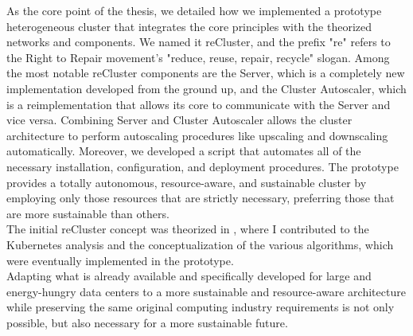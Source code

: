 As the core point of the thesis, we detailed how we implemented a prototype
heterogeneous cluster that integrates the core principles with the theorized
networks and components. We named it reCluster, and the prefix "re" refers to
the Right to Repair movement's "reduce, reuse, repair, recycle" slogan. Among
the most notable reCluster components are the Server, which is a completely new implementation
developed from the ground up, and the Cluster Autoscaler, which is a reimplementation
that allows its core to communicate with the Server and vice versa. Combining
Server and Cluster Autoscaler allows the cluster architecture to perform
autoscaling procedures like upscaling and downscaling automatically. Moreover,
we developed a script that automates all of the necessary installation, configuration,
and deployment procedures. The prototype provides a totally autonomous, resource-aware,
and sustainable cluster by employing only those resources that are strictly necessary,
preferring those that are more sustainable than others. \\ %

The initial reCluster concept was theorized in \cite{conceptualising_resource_aware},
where I contributed to the Kubernetes analysis and the conceptualization of the
various algorithms, which were eventually implemented in the prototype. \\ %

Adapting what is already available and specifically developed for large and
energy-hungry data centers to a more sustainable and resource-aware architecture
while preserving the same original computing industry requirements is not only
possible, but also necessary for a more sustainable future.